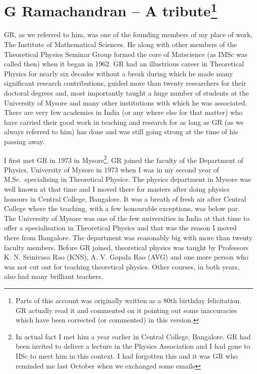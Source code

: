 
\renewcommand{\thefootnote}{\arabic{footnote}}

\chapter[G Ramachandran – A tribute]{G Ramachandran – A tribute\footnote{Parts of this account was originally written as a 80th birthday felicitation. GR actually read it and commented on it pointing out some inaccuracies which have been corrected (or commented) in this version.}}\label{chap24}


GR, as we referred to him, was one of the founding members of my place of work, The Institute of Mathematical Sciences. He along with other members of the Theoretical Physics Seminar Group formed the core of Matscience (as IMSc was called then) when it began in 1962. GR had an illustrious career in Theoretical Physics for nearly six decades without a break during which he made many significant research contributions, guided more than twenty researchers for their doctoral degrees and, most importantly taught a huge number of students at the University of Mysore and many other institutions with which he was associated. There are very few academics in India (or any where else for that matter) who have carried their good work in teaching and research for as long as GR (as we always referred to him) has done and was still going strong at the time of his passing away.

I first met GR in 1973 in Mysore\footnote{In actual fact I met him a year earlier in Central College, Bangalore. GR had been invited to deliver a lecture in the Physics Association and I had gone to IISc to meet him in this context. I had forgotten this and it was GR who reminded me last October when we exchanged some emails}. GR joined the faculty of the Department of Physics, University of Mysore in 1973 when I was in my second year of M.Sc.\ specialising in Theoretical Physics. The physics department in Mysore was well known at that time and I moved there for masters after doing physics honours in Central College, Bangalore. It was a breath of fresh air after Central College where the teaching, with a few honourable exceptions, was  below par. The University of Mysore was one of the few universities in India at that time to offer a specialisation in Theoretical Physics and that was the reason I moved there from Bangalore. The department was reasonably big with more than twenty faculty members. Before GR joined, theoretical physics was taught by Professors K. N. Srinivasa Rao (KNS), A. V. Gopala Rao (AVG) and one more person who was not cut out for teaching theoretical physics. Other courses, in both years, also had many brilliant teachers.

